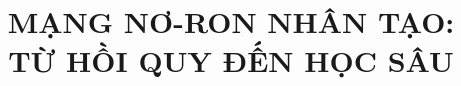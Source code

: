 \documentclass[print]{dissertation}%
\theoremstyle{definition}
\theoremstyle{definition}
\theoremstyle{definition}
\theoremstyle{definition}
\begin{document}
\title{MẠNG NƠ-RON NHÂN TẠO: TỪ HỒI QUY ĐẾN HỌC SÂU}
\author{}{}

\frontmatter








\tableofcontents
\listoffigures
\listoftables
\mainmatter

\thumbtrue









\thumbfalse
%
%
%
\appendix


\thumbfalse

%


%
\small
%
%
\normalsize
%
%
%
%
\end{document}
